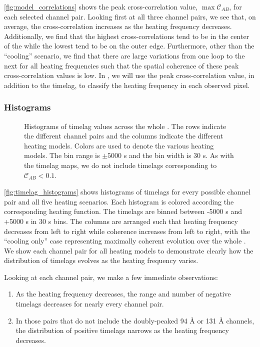 \autoref{fig:model_correlations} shows the peak cross-correlation value, $\max\mathcal{C}_{AB}$, for each selected channel pair. Looking first at all three channel pairs, we see that, on average, the cross-correlation increases as the heating frequency decreases. Additionally, we find that the highest cross-correlations tend to be in the center of the \AR{} while the lowest tend to be on the outer edge. Furthermore, other than the ``cooling'' scenario, we find that there are large variations from one loop to the next for all heating frequencies such that the spatial coherence of these peak cross-correlation values is low. In , we will use the peak cross-correlation value, in addition to the timelag, to classify the heating frequency in each observed pixel. 

\subsubsection{Histograms}\label{timelag_histograms}

\begin{figure*}
    \caption{Histograms of timelag values across the whole \AR{}. The rows indicate the different channel pairs and the columns indicate the different heating models. Colors are used to denote the various heating models. The bin range is $\pm5000$ s and the bin width is 30 s. As with the timelag maps, we do not include timelags corresponding to $\mathcal{C}_{AB}<0.1$.}
    \label{fig:timelag_histograms}
\end{figure*}

\autoref{fig:timelag_histograms} shows histograms of timelags for every possible channel pair and all five heating scenarios. Each histogram is colored according the corresponding heating function. The timelags are binned between -5000 s and +5000 s in 30 s bins. The columns are arranged such that heating frequency decreases from left to right while coherence increases from left to right, with the ``cooling only'' case representing maximally coherent evolution over the whole \AR{}. We show each channel pair for all heating models to demonstrate clearly how the distribution of timelags evolves as the heating frequency varies.

Looking at each channel pair, we make a few immediate observations: 
\begin{enumerate}
\item As the heating frequency decreases, the range and number of negative timelags decreases for nearly every channel pair.
\item In those pairs that do not include the doubly-peaked 94 \AA{} or 131 \AA{} channels, the distribution of positive timelags narrows as the heating frequency decreases.
\end{enumerate}

